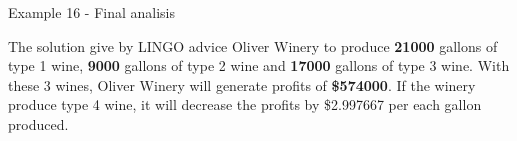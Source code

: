 \begin{frame}{Example 16 - Final analisis}

The solution give by LINGO advice Oliver Winery to produce \textbf{21000} gallons
of type 1 wine, \textbf{9000} gallons of type 2 wine and \textbf{17000} gallons
of type 3 wine.
With these 3 wines, Oliver Winery will generate profits of \textbf{\$574000}.
If the winery produce type 4 wine, it will decrease the profits by \$2.997667
per each gallon produced.

\end{frame}
